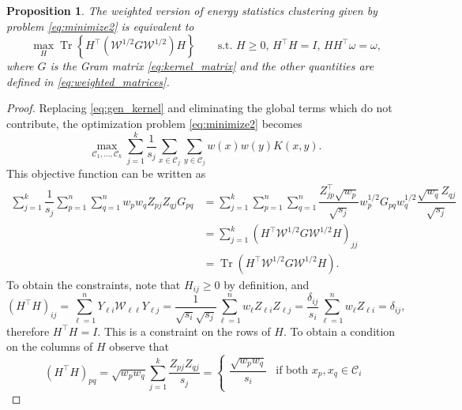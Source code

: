 \documentclass[aps,preprint,nofootinbib,floatfix]{revtex4-1}
\newtheorem{proposition}[theorem]{Proposition}
\DeclareMathOperator{\Tr}{Tr}
\newcommand\kk{K}
\newcommand\C{{\mathcal{C}}}
\newcommand\om{\omega}
\begin{document}
\begin{proposition}
\label{th:qcqp3}
The weighted version of energy statistics clustering given by
problem \eqref{eq:minimize2} is equivalent to
\begin{equation}
\label{eq:qcqp3}
\max_H \Tr \left\{ H^\top (\mathcal{W}^{1/2} G \mathcal{W}^{1/2}) H  \right\}
\qquad \mbox{s.t. $H \ge 0$, $H^\top H = I$, $H H^\top \om =
\om$,}
\end{equation}
where $G$ is the Gram matrix \eqref{eq:kernel_matrix} and the other quantities
are defined in 
\eqref{eq:weighted_matrices}.
\end{proposition}
\begin{proof}
Replacing \eqref{eq:gen_kernel} and eliminating the global terms which 
do not contribute, the optimization problem \eqref{eq:minimize2}
becomes 
\begin{equation}
\max_{\C_1,\dotsc,\C_k} \sum_{j=1}^k \dfrac{1}{s_j}
\sum_{x\in\C_j}\sum_{y\in\C_j} w(x)w(y) \kk(x,y) . 
\end{equation}
This 
objective function can be written as
\begin{equation}
\begin{split}
\sum_{j=1}^k \dfrac{1}{s_j} 
\sum_{p=1}^n \sum_{q=1}^n 
w_p w_q Z_{pj} Z_{qj} G_{pq} &= 
\sum_{j=1}^k 
\sum_{p=1}^n \sum_{q=1}^n 
\dfrac{Z^\top_{jp}\sqrt{w_p}}{\sqrt{s_j}} w_p^{1/2} G_{pq} w_q^{1/2} 
\dfrac{\sqrt{w_q} Z_{qj}}{\sqrt{s_j}} \\
&= 
\sum_{j=1}^k \left(H^\top \mathcal{W}^{1/2} G \mathcal{W}^{1/2} H\right)_{jj}
\\
&= \Tr\left( H^\top \mathcal{W}^{1/2} G \mathcal{W}^{1/2} H  \right).
\end{split}
\end{equation}
To obtain the constraints, note that $H_{ij} \ge 0$ by definition, and
\begin{equation}
(H^\top H)_{ij} = \sum_{\ell=1}^n 
Y_{\ell i} \mathcal{W}_{\ell \ell} Y_{\ell j } = 
\dfrac{1}{\sqrt{s_i}\sqrt{s_j}} \sum_{\ell=1}^n w_\ell Z_{\ell i} Z_{\ell j}
= \dfrac{\delta_{ij}}{s_i} \sum_{\ell=1}^n w_\ell Z_{\ell i} = \delta_{ij},
\end{equation}
therefore $H^\top H = I$. This is a constraint on the rows of $H$.
To obtain a condition on the columns
of $H$ observe that
\begin{equation}
\left(H^\top H\right)_{pq} = \sqrt{w_p w_q}\sum_{j=1}^k \dfrac{Z_{pj}
Z_{qj}}{s_j} = \begin{cases}
\dfrac{\sqrt{w_p w_q}}{s_i} & \mbox{if both $x_p,x_q \in \C_i$} \\

\end{cases}
\end{equation}
\end{proof}
\end{document}
